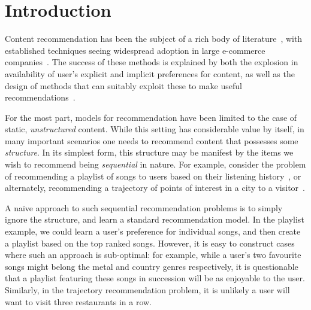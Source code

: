 
\secmoveup
\section{Introduction}
\label{sec:intro}
\textmoveup

Content recommendation has been the subject of a rich body of literature~\citep{Goldberg:1992,Sarwar:2001,Koren:2010},
with established techniques seeing widespread adoption in large e-commerce companies~\citep{Linden:2003,Agarwal:2013,Amatriain:2015,Gomez-Uribe:2015}.
The success of these methods is explained by both the explosion in availability of user's explicit and implicit preferences for content,
as well as the design of methods that can suitably exploit these to make useful recommendations~\citep{Koren:2009}.

For the most part, models for recommendation have been limited to the case of static, \emph{unstructured} content.
While this setting has considerable value by itself,
in many important scenarios one needs to recommend content that possesses some \emph{structure}.
In its simplest form, this structure may be manifest by the items we wish to recommend being \emph{sequential} in nature.
For example, consider the problem of recommending a playlist of songs to users based on their listening history~\citep{McFee:2011,chen2012playlist},
or alternately,
recommending a trajectory of points of interest in a city to a visitor~\citep{lu2010photo2trip,lu2012personalized,ijcai15,cikm16paper}.

A na\"{i}ve approach to such sequential recommendation problems is to simply ignore the structure,
and learn a standard recommendation model.
In the playlist example, we could learn a user's preference for individual songs,
and then create a playlist based on the top ranked songs.
However, it is easy to construct cases where such an approach is sub-optimal:
for example, while a user's two favourite songs might belong
the metal and country genres respectively,
it is questionable that a playlist featuring these songs in succession will be as enjoyable to the user.
Similarly, in the trajectory recommendation problem, it is unlikely a user will want to visit three restaurants in a row.


